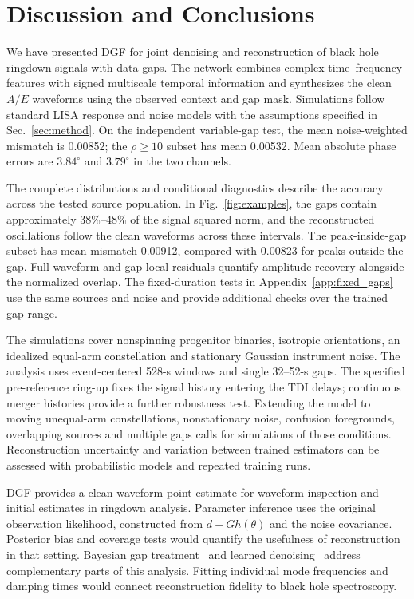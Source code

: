 \documentclass[10pt,prd,aps,a4paper,twocolumn,superscriptaddress,nofootinbib,floatfix]{revtex4-2}
\begin{document}
\section{Discussion and Conclusions}\label{sec:discussion}
We have presented DGF for joint denoising and reconstruction of black hole ringdown signals with data gaps. The network combines complex time--frequency features with signed multiscale temporal information and synthesizes the clean $A/E$ waveforms using the observed context and gap mask. Simulations follow standard LISA response and noise models with the assumptions specified in Sec.~\ref{sec:method}. On the independent variable-gap test, the mean noise-weighted mismatch is 0.00852; the $\rho\ge10$ subset has mean 0.00532. Mean absolute phase errors are $3.84^\circ$ and $3.79^\circ$ in the two channels.

The complete distributions and conditional diagnostics describe the accuracy across the tested source population. In Fig.~\ref{fig:examples}, the gaps contain approximately 38\%--48\% of the signal squared norm, and the reconstructed oscillations follow the clean waveforms across these intervals. The peak-inside-gap subset has mean mismatch 0.00912, compared with 0.00823 for peaks outside the gap. Full-waveform and gap-local residuals quantify amplitude recovery alongside the normalized overlap. The fixed-duration tests in Appendix~\ref{app:fixed_gaps} use the same sources and noise and provide additional checks over the trained gap range.

The simulations cover nonspinning progenitor binaries, isotropic orientations, an idealized equal-arm constellation and stationary Gaussian instrument noise. The analysis uses event-centered 528-s windows and single 32--52-s gaps. The specified pre-reference ring-up fixes the signal history entering the TDI delays; continuous merger histories provide a further robustness test. Extending the model to moving unequal-arm constellations, nonstationary noise, confusion foregrounds, overlapping sources and multiple gaps calls for simulations of those conditions. Reconstruction uncertainty and variation between trained estimators can be assessed with probabilistic models and repeated training runs.

DGF provides a clean-waveform point estimate for waveform inspection and initial estimates in ringdown analysis. Parameter inference uses the original observation likelihood, constructed from $d-Gh(\theta)$ and the noise covariance. Posterior bias and coverage tests would quantify the usefulness of reconstruction in that setting. Bayesian gap treatment~\cite{Baghi2019} and learned denoising~\cite{Wang:2024waveformer} address complementary parts of this analysis. Fitting individual mode frequencies and damping times would connect reconstruction fidelity to black hole spectroscopy.
\end{document}
